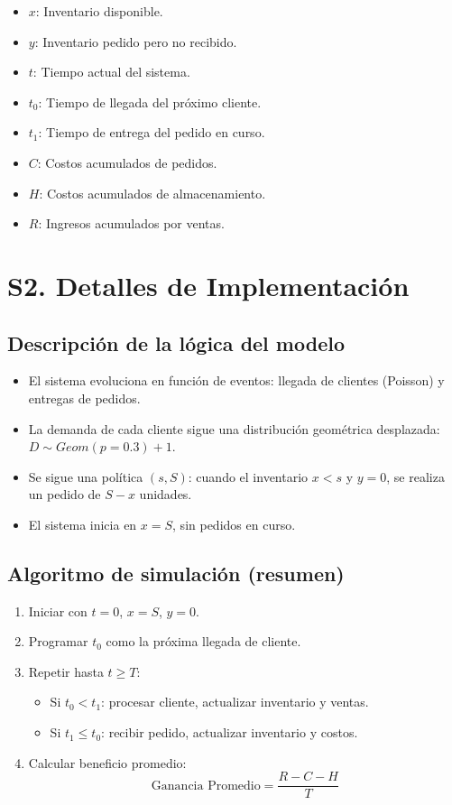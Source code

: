\documentclass{report}
\begin{document}
\begin{itemize}
\item \(x\): Inventario disponible.
\item \(y\): Inventario pedido pero no recibido.
\item \(t\): Tiempo actual del sistema.
\item \(t_0\): Tiempo de llegada del próximo cliente.
\item \(t_1\): Tiempo de entrega del pedido en curso.
\item \(C\): Costos acumulados de pedidos.
\item \(H\): Costos acumulados de almacenamiento.
\item \(R\): Ingresos acumulados por ventas.
\end{itemize}


\section*{S2. Detalles de Implementación}

\subsection*{Descripción de la lógica del modelo}

\begin{itemize}
\item El sistema evoluciona en función de eventos: llegada de clientes (Poisson) y entregas de 
pedidos.
\item La demanda de cada cliente sigue una distribución geométrica desplazada: 
\(D \sim Geom(p=0.3)+1\).
\item Se sigue una política \((s, S)\): cuando el inventario \(x < s\) y \(y = 0\), se 
realiza un pedido de \(S - x\) unidades.
\item El sistema inicia en \(x = S\), sin pedidos en curso.
\end{itemize}

\subsection*{Algoritmo de simulación (resumen)}

\begin{enumerate}
\item Iniciar con \(t=0\), \(x=S\), \(y=0\).
\item Programar \(t_0\) como la próxima llegada de cliente.
\item Repetir hasta \(t \geq T\):
  \begin{itemize}
  \item Si \(t_0 < t_1\): procesar cliente, actualizar inventario y ventas.
  \item Si \(t_1 \leq t_0\): recibir pedido, actualizar inventario y costos.
  \end{itemize}
\item Calcular beneficio promedio: \[ \text{Ganancia Promedio} = \frac{R - C - H}{T} \]
\end{enumerate}
\end{document}
